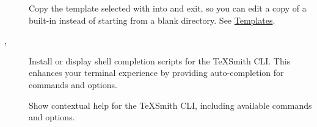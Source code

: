 \documentclass[a4paper,twoside]{article}
\begin{document}
\begin{description}
\item[{}] Copy the template selected with  into  and exit, so you can edit a copy of a built-in instead of starting from a blank directory. See \href{templates.md\#scaffolding-custom-templates}{Templates}.
\item[{, }] Install or display shell completion scripts for the TeXSmith CLI. This enhances your terminal experience by providing auto-completion for commands and options.
\item[{}] Show contextual help for the TeXSmith CLI, including available commands and options.
\end{description}
\end{document}

